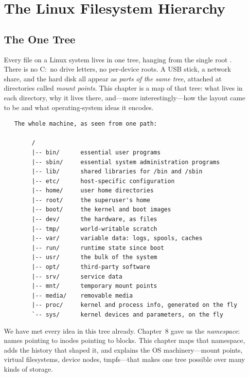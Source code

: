 
\chapter{The Linux Filesystem Hierarchy}

\section{The One Tree}

Every file on a Linux system lives in one tree, hanging from the single
root \code{/}. There is no C:\, no drive letters, no per-device roots.
A USB stick, a network share, and the hard disk all appear as
\emph{parts of the same tree}, attached at directories called
\emph{mount points}. This chapter is a map of that tree: what lives in
each directory, why it lives there, and---more interestingly---how the
layout came to be and what operating-system ideas it encodes.

\begin{verbatim}
   The whole machine, as seen from one path:

        /
        |-- bin/      essential user programs
        |-- sbin/     essential system administration programs
        |-- lib/      shared libraries for /bin and /sbin
        |-- etc/      host-specific configuration
        |-- home/     user home directories
        |-- root/     the superuser's home
        |-- boot/     the kernel and boot images
        |-- dev/      the hardware, as files
        |-- tmp/      world-writable scratch
        |-- var/      variable data: logs, spools, caches
        |-- run/      runtime state since boot
        |-- usr/      the bulk of the system
        |-- opt/      third-party software
        |-- srv/      service data
        |-- mnt/      temporary mount points
        |-- media/    removable media
        |-- proc/     kernel and process info, generated on the fly
        `-- sys/      kernel devices and parameters, on the fly
\end{verbatim}

We have met every idea in this tree already. Chapter~8 gave us the
\emph{namespace}: names pointing to inodes pointing to blocks. This
chapter maps that namespace, adds the history that shaped it, and
explains the OS machinery---mount points, virtual filesystems, device
nodes, tmpfs---that makes one tree possible over many kinds of storage.


